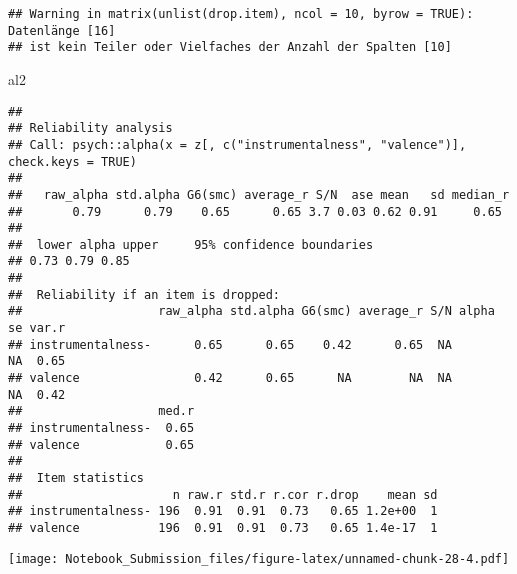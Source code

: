 \documentclass[
]{article}
\newenvironment{Shaded}{\begin{snugshade}}{\end{snugshade}}
\newcommand{\DataTypeTok}[1]{\textcolor[rgb]{0.13,0.29,0.53}{#1}}
\newcommand{\DecValTok}[1]{\textcolor[rgb]{0.00,0.00,0.81}{#1}}
\newcommand{\KeywordTok}[1]{\textcolor[rgb]{0.13,0.29,0.53}{\textbf{#1}}}
\newcommand{\NormalTok}[1]{#1}
\newcommand{\OperatorTok}[1]{\textcolor[rgb]{0.81,0.36,0.00}{\textbf{#1}}}
\newcommand{\StringTok}[1]{\textcolor[rgb]{0.31,0.60,0.02}{#1}}
\begin{document}
\begin{verbatim}
## Warning in matrix(unlist(drop.item), ncol = 10, byrow = TRUE): Datenlänge [16]
## ist kein Teiler oder Vielfaches der Anzahl der Spalten [10]
\end{verbatim}

\begin{Shaded}
\begin{Highlighting}[]
\NormalTok{al2}
\end{Highlighting}
\end{Shaded}

\begin{verbatim}
## 
## Reliability analysis   
## Call: psych::alpha(x = z[, c("instrumentalness", "valence")], check.keys = TRUE)
## 
##   raw_alpha std.alpha G6(smc) average_r S/N  ase mean   sd median_r
##       0.79      0.79    0.65      0.65 3.7 0.03 0.62 0.91     0.65
## 
##  lower alpha upper     95% confidence boundaries
## 0.73 0.79 0.85 
## 
##  Reliability if an item is dropped:
##                   raw_alpha std.alpha G6(smc) average_r S/N alpha se var.r
## instrumentalness-      0.65      0.65    0.42      0.65  NA       NA  0.65
## valence                0.42      0.65      NA        NA  NA       NA  0.42
##                   med.r
## instrumentalness-  0.65
## valence            0.65
## 
##  Item statistics 
##                     n raw.r std.r r.cor r.drop    mean sd
## instrumentalness- 196  0.91  0.91  0.73   0.65 1.2e+00  1
## valence           196  0.91  0.91  0.73   0.65 1.4e-17  1
\end{verbatim}

\begin{Shaded}
\end{Shaded}

\texttt{[image: Notebook\_Submission\_files/figure-latex/unnamed-chunk-28-4.pdf]}
\end{document}
